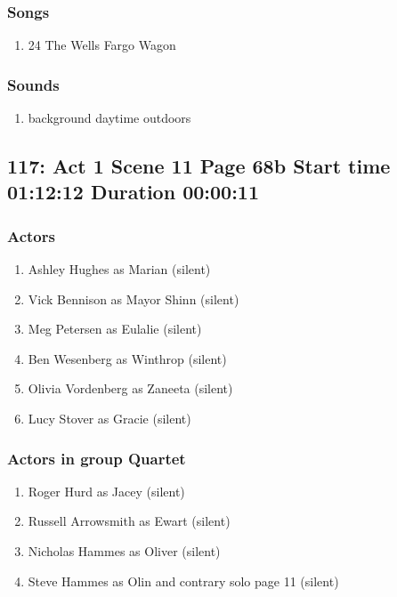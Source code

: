 \subsubsection{Songs}
\begin{enumerate}
\item 24 The Wells Fargo Wagon
\end{enumerate}\subsubsection{Sounds}
\begin{enumerate}
\item background daytime outdoors
\end{enumerate}
\subsection{117: Act 1 Scene 11 Page 68b Start time 01:12:12 Duration 00:00:11}

\subsubsection{Actors}
\begin{enumerate}
\item Ashley Hughes as Marian (silent)
\item Vick Bennison as Mayor Shinn (silent)
\item Meg Petersen as Eulalie (silent)
\item Ben Wesenberg as Winthrop (silent)
\item Olivia Vordenberg as Zaneeta (silent)
\item Lucy Stover as Gracie (silent)
\end{enumerate}
\subsubsection{Actors in group Quartet}
\begin{enumerate}
\item Roger Hurd as Jacey (silent)
\item Russell Arrowsmith as Ewart (silent)
\item Nicholas Hammes as Oliver (silent)
\item Steve Hammes as Olin and contrary solo page 11 (silent)
\end{enumerate}
